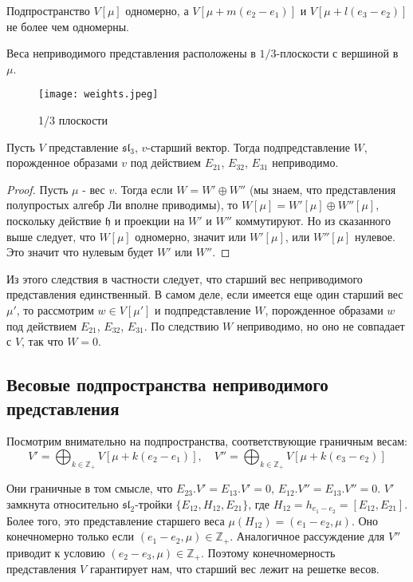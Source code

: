 \documentclass[a4article]{article}
\begin{document}
\begin{corollary}
    Подпространство $V[\mu]$ одномерно, а $V[\mu + m(e_2-e_1)]$ и $V[\mu + l(e_3-e_2)]$ не более чем одномерны. 
\end{corollary}
\begin{remark}
Веса неприводимого представления расположены в $1/3$-плоскости с вершиной в $\mu$.
\begin{figure}[h!]
    \centering
    \texttt{[image: weights.jpeg]}
    \caption{1/3 плоскости}
    \label{fig:enter-label}
\end{figure}
\end{remark}
\begin{corollary}
    Пусть $V$ представление $\mathfrak{sl}_3$, $v$-старший вектор. Тогда подпредставление $W$, порожденное образами $v$ под действием $E_{21}$, $E_{32}$, $E_{31}$ неприводимо.
\end{corollary}
\begin{proof}
    Пусть $\mu$ - вес $v$. Тогда если $W=W'\oplus W''$ (мы знаем, что представления полупростых алгебр Ли вполне приводимы), то $W[\mu] = W'[\mu]\oplus W''[\mu]$, поскольку действие $\mathfrak{h}$ и проекции на $W'$ и $W''$ коммутируют. Но из сказанного выше следует, что $W[\mu]$ одномерно, значит или $W'[\mu]$, или $W''[\mu]$ нулевое. Это значит что нулевым будет $W'$ или $W''$.
\end{proof}
Из этого следствия в частности следует, что старший вес неприводимого представления единственный. В самом деле, если имеется еще один старший вес $\mu'$, то рассмотрим $w \in V[\mu']$ и подпредставление $W$, порожденное образами $w$ под действием $E_{21}$, $E_{32}$, $E_{31}$. По следствию $W$ неприводимо, но оно не совпадает с $V$, так что $W=0$.
\subsection*{Весовые подпространства неприводимого представления}
Посмотрим внимательно на подпространства, соответствующие граничным весам:
\begin{equation}
    V'=\bigoplus_{k \in \mathbb{Z}_+} V[\mu + k(e_2-e_1)], \quad V''=\bigoplus_{k \in \mathbb{Z}_+} V[\mu + k(e_3-e_2)]
\end{equation}

Они граничные в том смысле, что $E_{23}.V'=E_{13}.V'=0$, $E_{12}.V''=E_{13}.V''=0$. $V'$ замкнута относительно $\mathfrak{sl}_2$-тройки $\{E_{12}, H_{12}, E_{21}\}$, где $H_{12} = h_{e_1 - e_2} = [E_{12}, E_{21}]$. Более того, это представление старшего веса $\mu(H_{12})=(e_1-e_2, \mu)$. Оно конечномерно только если $(e_1-e_2, \mu) \in \mathbb{Z}_+$.
Аналогичное рассуждение для $V''$ приводит к условию $(e_2-e_3, \mu) \in \mathbb{Z}_+$. Поэтому конечномерность представления $V$ гарантирует нам, что старший вес лежит на решетке весов.
\end{document}
